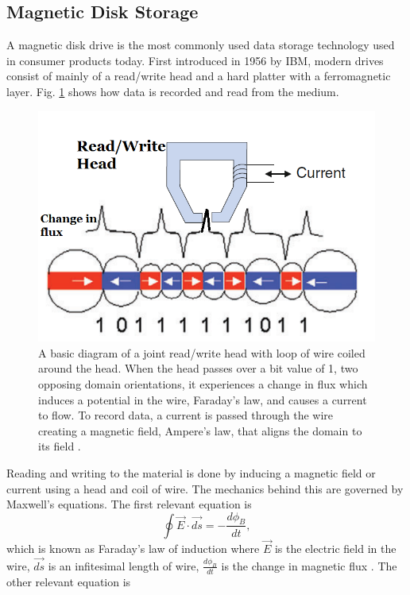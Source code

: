 \documentclass[ notitlepage, numerical, 11pt]{revtex4-1} %
\begin{document}
\subsection{Magnetic Disk Storage}
A magnetic disk drive is the most commonly used data storage technology used in consumer products today. First introduced in 1956 by IBM, modern drives consist of mainly of a read/write head and a hard platter with a ferromagnetic layer. Fig. \ref{basic} shows how data is recorded and read from the medium.
\begin{figure}[H]
\centerline{\includegraphics[scale=.45]{basic.png}}
\caption{A basic diagram of a joint read/write head with  loop of wire coiled around the head. When the head passes over a bit value of 1, two opposing domain orientations, it experiences a change in flux which induces a potential in the wire, Faraday's law, and causes a current to flow. To record data, a current is passed through the wire creating a magnetic field, Ampere's law, that aligns the domain to its field \cite{perpendicular}.}
\label{basic}
\end{figure}
Reading and writing to the material is done by inducing a magnetic field or current using a head and coil of wire. The mechanics behind this are governed by Maxwell's equations. The first relevant equation is
\begin{equation}
\oint \vec{E}\cdot \vec{ds} = -\frac{d\phi_B}{dt},
\label{faraday}
\end{equation}
which is known as Faraday's law of induction where $ \vec{E}$ is the electric field in the wire, $\vec{ds}$ is an infitesimal length of wire, $\frac{d\phi_B}{dt}$ is the change in magnetic flux \cite{purcell}. The other relevant equation is
\end{document}

